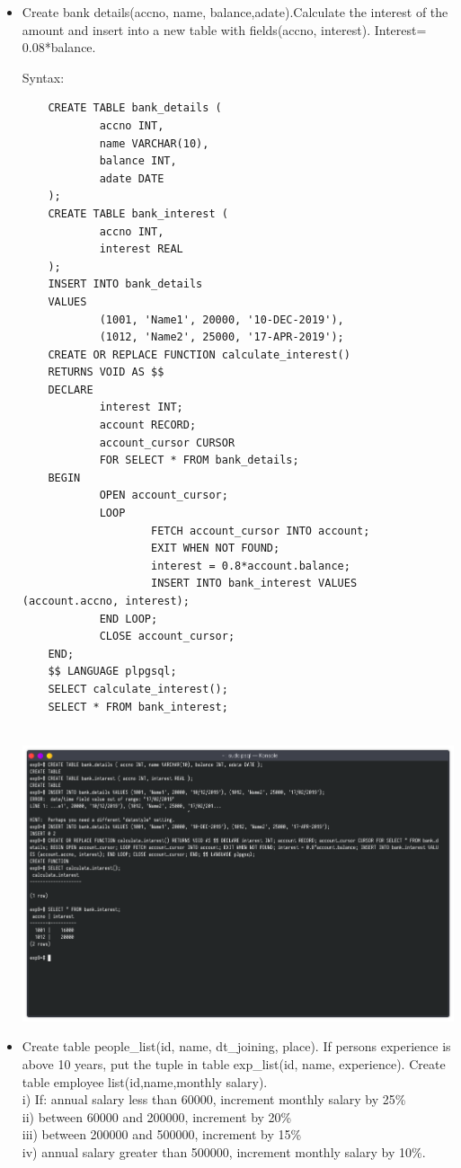 \documentclass[13pt,oneside]{book}
\begin{document}
\begin{itemize}
    
    \item
    Create bank details(accno, name, balance,adate).Calculate the interest of the amount and
     insert into a new table with fields(accno, interest). Interest= 0.08*balance.
     
    Syntax:
    \begin{verbatim}
    CREATE TABLE bank_details (
            accno INT,
            name VARCHAR(10),
            balance INT,
            adate DATE
    );
    CREATE TABLE bank_interest (
            accno INT,
            interest REAL
    );
    INSERT INTO bank_details 
    VALUES
            (1001, 'Name1', 20000, '10-DEC-2019'),
            (1012, 'Name2', 25000, '17-APR-2019');
    CREATE OR REPLACE FUNCTION calculate_interest()
    RETURNS VOID AS $$
    DECLARE
            interest INT;
            account RECORD;
            account_cursor CURSOR
            FOR SELECT * FROM bank_details;
    BEGIN
            OPEN account_cursor;
            LOOP
                    FETCH account_cursor INTO account;
                    EXIT WHEN NOT FOUND;
                    interest = 0.8*account.balance;
                    INSERT INTO bank_interest VALUES (account.accno, interest);
            END LOOP;
            CLOSE account_cursor;
    END;
    $$ LANGUAGE plpgsql;
    SELECT calculate_interest();
    SELECT * FROM bank_interest;
    
    \end{verbatim}
    \includegraphics[width=\textwidth]{img/p9/ss2.png}
    
    
    \item
    Create table people\_list(id, name, dt\_joining, place).
    If persons experience
     is above 10 years, put the tuple in table exp\_list(id, name, experience).
     Create table employee list(id,name,monthly salary).\\
     i) If: annual salary less than 60000, increment monthly salary by 25\% \\
     ii) between 60000 and 200000, increment by 20\% \\
     iii) between 200000 and 500000, increment by 15\% \\
     iv) annual salary greater than 500000, increment monthly salary by 10\%.
    

\end{itemize}
\end{document}
